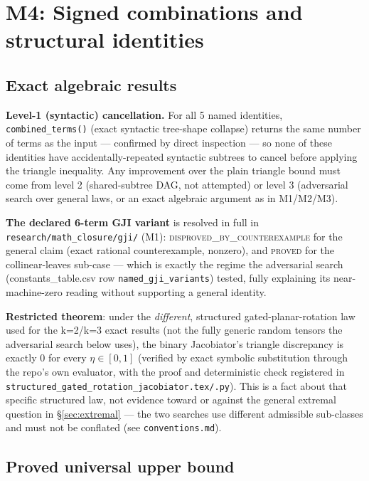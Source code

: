 \section*{M4: Signed combinations and structural identities}

\subsection*{Exact algebraic results}

\textbf{Level-1 (syntactic) cancellation.} For all 5 named identities,
\texttt{combined\_terms()} (exact syntactic tree-shape collapse) returns
the same number of terms as the input — confirmed by direct inspection —
so none of these identities have accidentally-repeated syntactic subtrees
to cancel before applying the triangle inequality. Any improvement over
the plain triangle bound must come from level 2 (shared-subtree DAG,
not attempted) or level 3 (adversarial search over general laws, or an
exact algebraic argument as in M1/M2/M3).

\textbf{The declared 6-term GJI variant} is resolved in full in
\texttt{research/math\_closure/gji/} (M1): \textsc{disproved\_by\_counterexample}
for the general claim (exact rational counterexample, nonzero), and
\textsc{proved} for the collinear-leaves sub-case — which is exactly the
regime the adversarial search (constants\_table.csv row
\texttt{named\_gji\_variants}) tested, fully explaining its
near-machine-zero reading without supporting a general identity.

\textbf{Restricted theorem}: under the
\emph{different}, structured gated-planar-rotation law used for the
k=2/k=3 exact results (not the fully generic random tensors the
adversarial search below uses), the binary Jacobiator's triangle
discrepancy is exactly $0$ for every $\eta\in[0,1]$ (verified by exact
symbolic substitution through the repo's own evaluator, with the proof and
deterministic check registered in
\texttt{structured\_gated\_rotation\_jacobiator.tex/.py}). This is a fact
about that specific structured law, not evidence toward or against the
general extremal question in \S\ref{sec:extremal} — the two searches use
different admissible sub-classes and must not be conflated (see
\texttt{conventions.md}).

\subsection*{Proved universal upper bound}
\label{sec:extremal}

